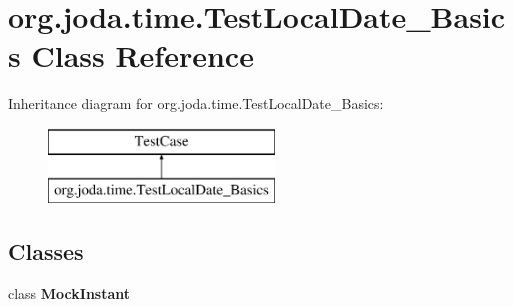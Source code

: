 \hypertarget{classorg_1_1joda_1_1time_1_1_test_local_date___basics}{\section{org.\-joda.\-time.\-Test\-Local\-Date\-\_\-\-Basics Class Reference}
\label{classorg_1_1joda_1_1time_1_1_test_local_date___basics}
}
Inheritance diagram for org.\-joda.\-time.\-Test\-Local\-Date\-\_\-\-Basics\-:\begin{figure}[H]
\begin{center}
\leavevmode
\includegraphics[height=2.000000cm]{classorg_1_1joda_1_1time_1_1_test_local_date___basics}
\end{center}
\end{figure}
\subsection*{Classes}
\begin{DoxyCompactItemize}
\item 
class {\bfseries Mock\-Instant}
\end{DoxyCompactItemize}
